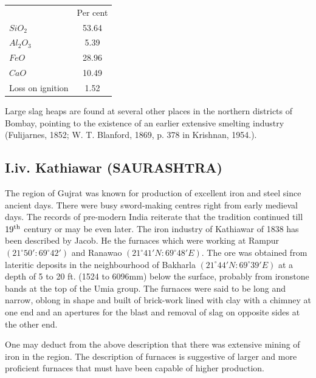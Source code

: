 \vspace{-.3cm}

\begin{center}
\begin{tabular}{lc}
& Per cent\\
$SiO_2$ & 53.64\\
$Al_2O_3$ & 5.39 \\
$FeO$ & 28.96\\
$CaO$ & 10.49\\
Loss on ignition & 1.52
\end{tabular}
\end{center}

\vspace{-.3cm}

Large slag heaps are found at several other places in the northern districts of Bombay, pointing to the existence of an earlier extensive smelting industry (Fulijarnes, 1852; W. T. Blanford, 1869, p. 378 in Krishnan, 1954.).

\vspace{-.3cm}

\subsection*{I.iv.  Kathiawar (SAURASHTRA)}\label{subsection-4}

\vspace{-.2cm}

The region of Gujrat was known for production of excellent iron and steel since ancient days. There were busy sword-making centres right from early medieval days. The records of pre-modern India reiterate that the tradition continued till $19^{\rm th}$ century or may be even later. The iron industry of Kathiawar of 1838 has been described by Jacob. He the furnaces which were working at Rampur $(21^\circ 50': 69^\circ 42')$ and Ranawao $(21^\circ 41'N: 69^\circ 48'E)$. The ore was obtained from lateritic deposits in the neighbourhood of Bakharla $(21^\circ 44'N: 69^\circ 39'E)$ at a depth of 5 to 20 ft. (1524 to 6096mm) below the surface, probably from ironstone bands at the top of the Umia group.  The furnaces were said to be long and narrow, oblong in shape and built of brick-work lined with clay with a chimney at one end and an apertures for the blast and removal of slag on opposite sides at the other end. 

One may deduct from the above description that there was extensive mining of iron in the region. The description of furnaces is suggestive of larger and more proficient furnaces that must have been capable of higher production. 

